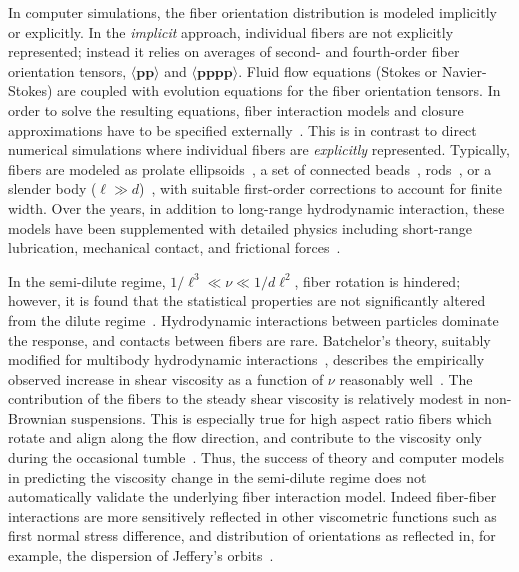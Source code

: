 \documentclass[AMA,STIX1COL]{WileyNJD-v2}
\begin{document}
In computer simulations, the fiber orientation distribution is modeled
implicitly or explicitly. In the \emph{implicit} approach, individual
fibers are not explicitly represented; instead it relies on averages of
second- and fourth-order fiber orientation tensors, $\langle \mathbf{p
p} \rangle$ and $\langle \mathbf{p p p p} \rangle$. Fluid flow equations
(Stokes or Navier-Stokes) are coupled with evolution equations for the
fiber orientation tensors. In order to solve the resulting equations,
fiber interaction models and closure approximations have to be specified
externally~\cite{Advani1987, Advani1990, Ferec2014, Perez2017}. This is
in contrast to direct numerical simulations where individual fibers are
\emph{explicitly} represented. Typically, fibers are modeled as
prolate ellipsoids~\cite{Ausias2006}, a set of connected
beads~\cite{Yamamoto1996, Joung2001}, rods~\cite{Schmid2000,
Lindstroem2007}, or a slender body ($\ell \gg d$)~\cite{Fan1998,
Rahnama1995, tor-she2004, tor-gus2006, gus-tor2009}, with suitable
first-order corrections to account for finite width. Over the years, in
addition to long-range hydrodynamic interaction, these models have been
supplemented with detailed physics including short-range lubrication,
mechanical contact, and frictional forces~\cite{Sundararajakumar1997,
Lindstroem2008}.

In the semi-dilute regime, $1/\ell^3 \ll \nu \ll 1/d\ell^2$, fiber
rotation is hindered; however, it is found that the statistical
properties are not significantly altered from the dilute
regime~\cite{larsoncf}.  Hydrodynamic interactions between particles
dominate the response, and contacts between fibers are rare. Batchelor's
theory, suitably modified for multibody hydrodynamic
interactions~\cite{Shaqfeh1990, Mackaplow1996}, describes the
empirically observed increase in shear viscosity as a function of $\nu$
reasonably well~\cite{Stover1992, Bibbo1987, Petrich2000}. The
contribution of the fibers to the steady shear viscosity is relatively
modest in non-Brownian suspensions. This is especially true for high
aspect ratio fibers which rotate and align along the flow direction, and
contribute to the viscosity only during the occasional
tumble~\cite{larsoncf}.  Thus, the success of theory and computer models
in predicting the viscosity change in the semi-dilute regime does not
automatically validate the underlying fiber interaction model. Indeed
fiber-fiber interactions are more sensitively reflected in other
viscometric functions such as first normal stress difference, and
distribution of orientations as reflected in, for example, the
dispersion of Jeffery's orbits~\cite{Lindstroem2009}.
\end{document}
